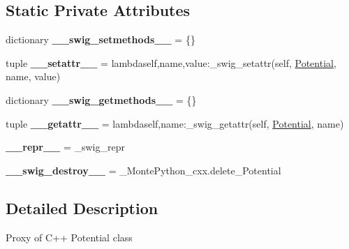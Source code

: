 \subsection*{Static Private Attributes}
\begin{DoxyCompactItemize}
\item 
\hypertarget{classMontePython__cxx_1_1Potential_ae51373728efe3f2335724643eff9f5ea}{}dictionary {\bfseries \+\_\+\+\_\+swig\+\_\+setmethods\+\_\+\+\_\+} = \{\}\label{classMontePython__cxx_1_1Potential_ae51373728efe3f2335724643eff9f5ea}

\item 
\hypertarget{classMontePython__cxx_1_1Potential_a9a5aac2836e1233fdf8b792882b502ab}{}tuple {\bfseries \+\_\+\+\_\+setattr\+\_\+\+\_\+} = lambdaself,name,value\+:\+\_\+swig\+\_\+setattr(self, \hyperlink{classMontePython__cxx_1_1Potential}{Potential}, name, value)\label{classMontePython__cxx_1_1Potential_a9a5aac2836e1233fdf8b792882b502ab}

\item 
\hypertarget{classMontePython__cxx_1_1Potential_acdf1420253f58e41c45e37d4a20b0148}{}dictionary {\bfseries \+\_\+\+\_\+swig\+\_\+getmethods\+\_\+\+\_\+} = \{\}\label{classMontePython__cxx_1_1Potential_acdf1420253f58e41c45e37d4a20b0148}

\item 
\hypertarget{classMontePython__cxx_1_1Potential_a049318e544e2a06662bc5b222a44f283}{}tuple {\bfseries \+\_\+\+\_\+getattr\+\_\+\+\_\+} = lambdaself,name\+:\+\_\+swig\+\_\+getattr(self, \hyperlink{classMontePython__cxx_1_1Potential}{Potential}, name)\label{classMontePython__cxx_1_1Potential_a049318e544e2a06662bc5b222a44f283}

\item 
\hypertarget{classMontePython__cxx_1_1Potential_a6a7b173b6ca5506ec569093d941854d3}{}{\bfseries \+\_\+\+\_\+repr\+\_\+\+\_\+} = \+\_\+swig\+\_\+repr\label{classMontePython__cxx_1_1Potential_a6a7b173b6ca5506ec569093d941854d3}

\item 
\hypertarget{classMontePython__cxx_1_1Potential_a03c533dbfafa93f5d29394452c7c4496}{}{\bfseries \+\_\+\+\_\+swig\+\_\+destroy\+\_\+\+\_\+} = \+\_\+\+Monte\+Python\+\_\+cxx.\+delete\+\_\+\+Potential\label{classMontePython__cxx_1_1Potential_a03c533dbfafa93f5d29394452c7c4496}

\end{DoxyCompactItemize}


\subsection{Detailed Description}
\begin{DoxyVerb}Proxy of C++ Potential class\end{DoxyVerb}
 

